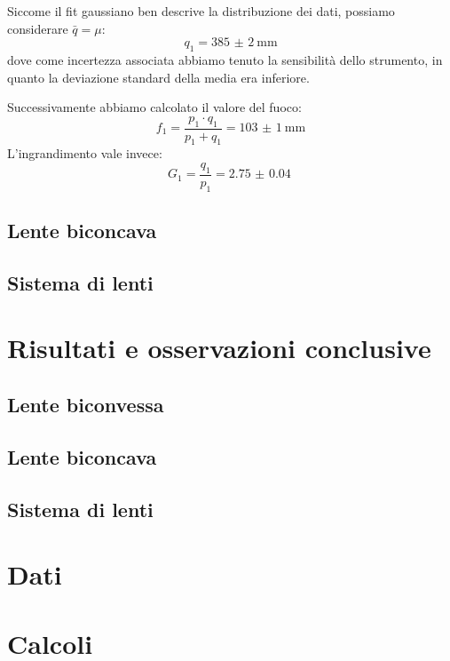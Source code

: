 \documentclass[a4paper]{article}
\begin{document}
    Siccome il fit gaussiano ben descrive la distribuzione dei dati, possiamo considerare $\bar{q} = \mu$:
    \[
    q_1 = \SI{385(2)}{\mm}
    \]
    dove come incertezza associata abbiamo tenuto la sensibilità dello strumento, in quanto la deviazione standard della media era inferiore.
    
    Successivamente abbiamo calcolato il valore del fuoco:
    \[
    f_1=\frac{p_1\cdot q_1}{p_1+q_1} = \SI{103(1)}{\mm}
    \]
    L'ingrandimento vale invece:
    \[
    G_1=\frac{q_1}{p_1}=\SI{2.75(4)}{}
    \]
    \subsection{Lente biconcava}
    \subsection{Sistema di lenti}
\section{Risultati e osservazioni conclusive}
    \subsection{Lente biconvessa}
    \subsection{Lente biconcava}
    \subsection{Sistema di lenti}
\begin{appendices}
    \section{Dati}
    \section{Calcoli}
\end{appendices}
\end{document}
